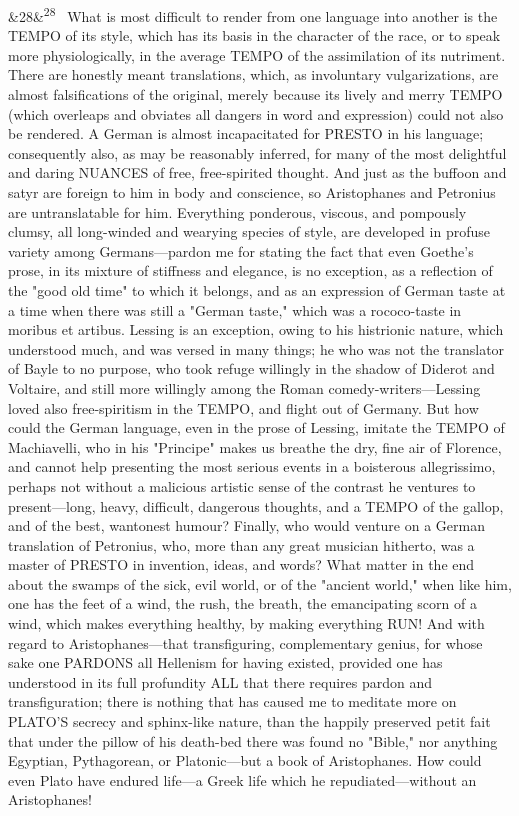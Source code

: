\documentclass[12pt]{article}
\newcommand{\para}[1][]{\par\noindent\ifx&#1&\else\textsuperscript{\footnotesize #1}~\fi}
\begin{document}
\para[28] What is most difficult to render from one language into another is the TEMPO of its style, which has its basis in the character of the race, or to speak more physiologically, in the average TEMPO of the assimilation of its nutriment. There are honestly meant translations, which, as involuntary vulgarizations, are almost falsifications of the original, merely because its lively and merry TEMPO (which overleaps and obviates all dangers in word and expression) could not also be rendered. A German is almost incapacitated for PRESTO in his language; consequently also, as may be reasonably inferred, for many of the most delightful and daring NUANCES of free, free-spirited thought. And just as the buffoon and satyr are foreign to him in body and conscience, so Aristophanes and Petronius are untranslatable for him. Everything ponderous, viscous, and pompously clumsy, all long-winded and wearying species of style, are developed in profuse variety among Germans---pardon me for stating the fact that even Goethe's prose, in its mixture of stiffness and elegance, is no exception, as a reflection of the "good old time" to which it belongs, and as an expression of German taste at a time when there was still a "German taste," which was a rococo-taste in moribus et artibus. Lessing is an exception, owing to his histrionic nature, which understood much, and was versed in many things; he who was not the translator of Bayle to no purpose, who took refuge willingly in the shadow of Diderot and Voltaire, and still more willingly among the Roman comedy-writers---Lessing loved also free-spiritism in the TEMPO, and flight out of Germany. But how could the German language, even in the prose of Lessing, imitate the TEMPO of Machiavelli, who in his "Principe" makes us breathe the dry, fine air of Florence, and cannot help presenting the most serious events in a boisterous allegrissimo, perhaps not without a malicious artistic sense of the contrast he ventures to present---long, heavy, difficult, dangerous thoughts, and a TEMPO of the gallop, and of the best, wantonest humour? Finally, who would venture on a German translation of Petronius, who, more than any great musician hitherto, was a master of PRESTO in invention, ideas, and words? What matter in the end about the swamps of the sick, evil world, or of the "ancient world," when like him, one has the feet of a wind, the rush, the breath, the emancipating scorn of a wind, which makes everything healthy, by making everything RUN! And with regard to Aristophanes---that transfiguring, complementary genius, for whose sake one PARDONS all Hellenism for having existed, provided one has understood in its full profundity ALL that there requires pardon and transfiguration; there is nothing that has caused me to meditate more on PLATO'S secrecy and sphinx-like nature, than the happily preserved petit fait that under the pillow of his death-bed there was found no "Bible," nor anything Egyptian, Pythagorean, or Platonic---but a book of Aristophanes. How could even Plato have endured life---a Greek life which he repudiated---without an Aristophanes!
\end{document}
